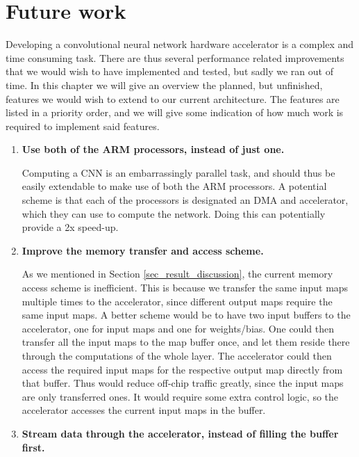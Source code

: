 \chapter{Future work} \label{chap_future_work}

Developing a convolutional neural network hardware accelerator is a complex and time consuming task. There are thus several performance related improvements that we would wish to have implemented and tested, but sadly we ran out of time. In this chapter we will give an overview the planned, but unfinished, features we would wish to extend to our current architecture. The features are listed in a priority order, and we will give some indication of how much work is required to implement said features.


\begin{enumerate}                           

\item \textbf{Use both of the ARM processors, instead of just one.}

	Computing a CNN is an embarrassingly parallel task, and should thus be easily extendable to make use of both the ARM processors. A potential scheme is that each of the processors is designated an DMA and accelerator, which they can use to compute the network. Doing this can potentially provide a 2x speed-up.

  \item \textbf{Improve the memory transfer and access scheme.}
    
    As we mentioned in Section \ref{sec_result_discussion}, the current memory access scheme is inefficient. This is because we transfer the same input maps multiple times to the accelerator, since different output maps require the same input maps. A better scheme would be to have two input buffers to the accelerator, one for input maps and one for weights/bias. One could then transfer all the input maps to the map buffer once, and let them reside there through the computations of the whole layer. The accelerator could then access the required input maps for the respective output map directly from that buffer. Thus would reduce off-chip traffic greatly, since the input maps are only transferred ones. It would require some extra control logic, so the accelerator accesses the current input maps in the buffer. 

	\item \textbf{Stream data through the accelerator, instead of filling the buffer first.}
	

\end{enumerate}
